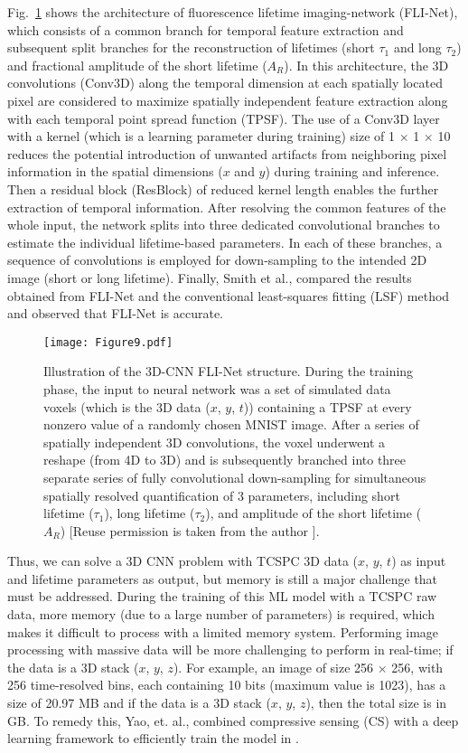 \documentclass[12pt]{iopart}
\begin{document}
Fig.~\ref{fig1_netflics2} shows the architecture of fluorescence lifetime imaging-network (FLI-Net), which consists of a common branch for temporal feature extraction and subsequent split branches for the reconstruction of lifetimes (short $\tau_1$ and long $\tau_2$) and fractional amplitude of the short lifetime ($A_R$). In this architecture, the 3D convolutions (Conv3D) along the temporal dimension at each spatially located pixel are considered to maximize spatially independent feature extraction along with each temporal point spread function (TPSF). The use of a Conv3D layer with a kernel (which is a learning parameter during training) size of 1 $\times$ 1 $\times$ 10 reduces the potential introduction of unwanted artifacts from neighboring pixel information in the spatial dimensions ($x$ and $y$) during training and inference. Then a residual block (ResBlock) of reduced kernel length enables the further extraction of temporal information. After resolving the common features of the whole input, the network splits into three dedicated convolutional branches to estimate the individual lifetime-based parameters. In each of these branches, a sequence of convolutions is employed for down-sampling to the intended 2D image (short or long lifetime). Finally, Smith et al., \cite{netflics2} compared the results obtained from FLI-Net and the conventional least-squares fitting (LSF) method and observed that FLI-Net is accurate. 

\begin{figure}[!t]
\centering
\texttt{[image: Figure9.pdf]}
\caption{Illustration of the 3D-CNN FLI-Net structure. During the training phase, the input to neural network was a set of simulated data voxels (which is the 3D data ($x$, $y$, $t$)) containing a TPSF at every nonzero value of a randomly chosen MNIST image. After a series of spatially independent 3D convolutions, the voxel underwent a reshape (from 4D to 3D) and is subsequently branched into three separate series of fully convolutional down-sampling for simultaneous spatially resolved quantification of 3 parameters, including short lifetime ($\tau_1$), long lifetime ($\tau_2$), and amplitude of the short lifetime ($A_R$) [Reuse permission is taken from the author \cite{netflics2}].} \label{fig1_netflics2}
\end{figure}

Thus, we can solve a 3D CNN problem with TCSPC 3D data ($x$, $y$, $t$) as input and lifetime parameters as output, but memory is still a major challenge that must be addressed. During the training of this ML model with a TCSPC raw data, more memory (due to a large number of parameters) is required, which makes it difficult to process with a limited memory system. Performing image processing with massive data will be more challenging to perform in real-time; if the data is a 3D stack ($x$, $y$, $z$). For example, an image of size 256 $\times$ 256, with 256 time-resolved bins, each containing 10 bits (maximum value is 1023), has a size of 20.97 MB and if the data is a 3D stack ($x$, $y$, $z$), then the total size is in GB. To remedy this, Yao, et. al., combined compressive sensing (CS) with a deep learning framework to efficiently train the model in \cite{netflics1}.
\end{document}
